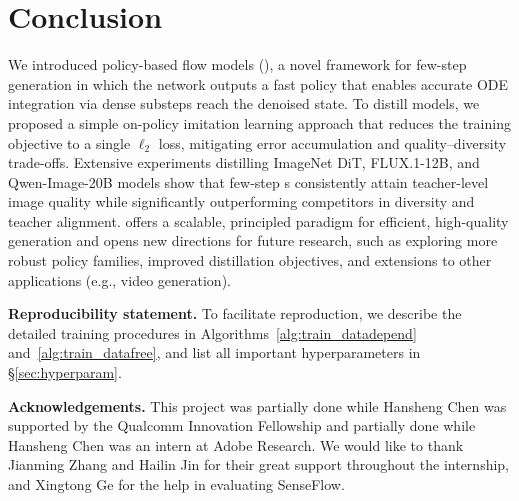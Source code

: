\section{Conclusion}
We introduced policy-based flow models (\methodname), a novel framework for few-step generation in which the network outputs a fast policy that enables accurate ODE integration via dense substeps reach the denoised state. To distill \methodname{} models, we proposed a simple on-policy imitation learning approach that reduces the training objective to a single $\ell_2$ loss, mitigating error accumulation and quality--diversity trade-offs. Extensive experiments distilling ImageNet DiT, FLUX.1-12B, and Qwen-Image-20B models show that few-step \methodname s consistently attain teacher-level image quality while significantly outperforming competitors in diversity and teacher alignment. \methodname{} offers a scalable, principled paradigm for efficient, high-quality generation and opens new directions for future research, such as exploring more robust policy families, improved distillation objectives, and extensions to other applications (e.g., video generation).

\textbf{Reproducibility statement.} 
To facilitate reproduction, we describe the detailed training procedures in Algorithms~\ref{alg:train_datadepend} and~\ref{alg:train_datafree}, and list all important hyperparameters in \S\ref{sec:hyperparam}.

\ificlrfinal

\textbf{Acknowledgements.} This project was partially done while Hansheng Chen was supported by the Qualcomm Innovation Fellowship and partially done while Hansheng Chen was an intern at Adobe Research. We would like to thank Jianming Zhang and Hailin Jin for their great support throughout the internship, and Xingtong Ge for the help in evaluating SenseFlow.

\fi
